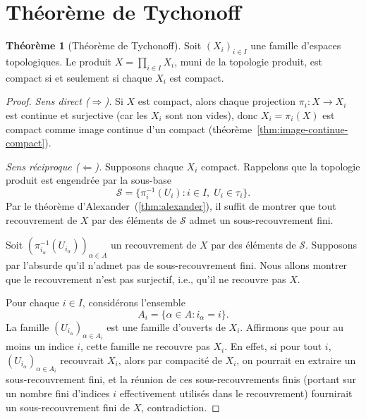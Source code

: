 \documentclass[12pt,a4paper,openany]{book}
\theoremstyle{definition}
\theoremstyle{cours}
\newtheorem{theoreme}{Théorème}[chapter]
\theoremstyle{coursnormal}
\begin{document}
\section{Théorème de Tychonoff}\label{sec:tychonoff}

\begin{theoreme}[Théorème de Tychonoff]\label{thm:tychonoff}
  Soit $(X_i)_{i\in I}$ une famille d'espaces topologiques. Le produit $X=\prod_{i\in I}X_i$, muni de la topologie produit,
  est compact si et seulement si chaque $X_i$ est compact.
\end{theoreme}

\begin{proof}
  \emph{Sens direct ($\Rightarrow$).} Si $X$ est compact, alors chaque
  projection $\pi_i\colon X\to X_i$ est continue et surjective (car les $X_i$
  sont non vides), donc $X_i=\pi_i(X)$ est compact comme image continue d'un
  compact (théorème~\ref{thm:image-continue-compact}).

  \medskip
  \emph{Sens réciproque ($\Leftarrow$).} Supposons chaque $X_i$ compact.
  Rappelons que la topologie produit est engendrée par la sous-base
  \[
    \mathcal{S} = \bigl\{\pi_i^{-1}(U_i) : i\in I,\; U_i\in\tau_i\bigr\}.
  \]
  Par le théorème d'Alexander~(\ref{thm:alexander}), il suffit de montrer que
  tout recouvrement de $X$ par des éléments de $\mathcal{S}$ admet un
  sous-recouvrement fini.

  Soit $(\pi_{i_\alpha}^{-1}(U_{i_\alpha}))_{\alpha\in A}$ un recouvrement de
  $X$ par des éléments de $\mathcal{S}$. Supposons par l'absurde qu'il n'admet
  pas de sous-recouvrement fini. Nous allons montrer que le recouvrement n'est
  pas surjectif, i.e., qu'il ne recouvre pas $X$.

  Pour chaque $i\in I$, considérons l'ensemble
  \[
    A_i = \{\alpha\in A : i_\alpha = i\}.
  \]
  La famille $(U_{i_\alpha})_{\alpha\in A_i}$ est une famille d'ouverts de
  $X_i$. Affirmons que pour au moins un indice $i$, cette famille ne recouvre
  pas $X_i$. En effet, si pour tout $i$, $(U_{i_\alpha})_{\alpha\in A_i}$
  recouvrait $X_i$, alors par compacité de $X_i$, on pourrait en extraire un
  sous-recouvrement fini, et la réunion de ces sous-recouvrements finis (portant
  sur un nombre fini d'indices $i$ effectivement utilisés dans le recouvrement)
  fournirait un sous-recouvrement fini de $X$, contradiction.


\end{proof}
\end{document}
